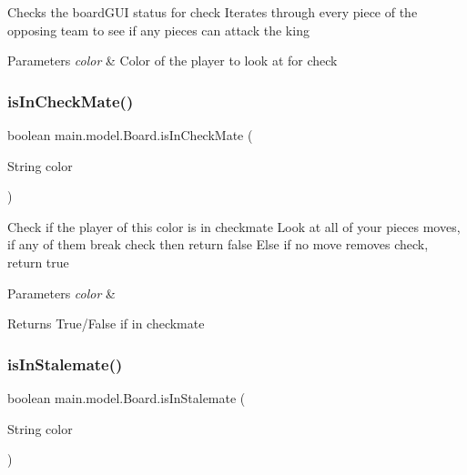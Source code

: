 Checks the board\+G\+UI status for check Iterates through every piece of the opposing team to see if any pieces can attack the king 
\begin{DoxyParams}{Parameters}
{\em color} & Color of the player to look at for check \\
\hline
\end{DoxyParams}
\hypertarget{classmain_1_1model_1_1_board_abb5dfd9e2e597dd686351c1f06fbcb38}{}\label{classmain_1_1model_1_1_board_abb5dfd9e2e597dd686351c1f06fbcb38} 
\subsubsection{\texorpdfstring{is\+In\+Check\+Mate()}{isInCheckMate()}}
{\footnotesize\ttfamily boolean main.\+model.\+Board.\+is\+In\+Check\+Mate (\begin{DoxyParamCaption}\item[{String}]{color }\end{DoxyParamCaption})}

Check if the player of this color is in checkmate Look at all of your piece\textquotesingle{}s moves, if any of them break check then return false Else if no move removes check, return true 
\begin{DoxyParams}{Parameters}
{\em color} & \\
\hline
\end{DoxyParams}
\begin{DoxyReturn}{Returns}
True/\+False if in checkmate 
\end{DoxyReturn}
\hypertarget{classmain_1_1model_1_1_board_a6c144f940cc67d3f2f648f7fcc58294b}{}\label{classmain_1_1model_1_1_board_a6c144f940cc67d3f2f648f7fcc58294b} 
\subsubsection{\texorpdfstring{is\+In\+Stalemate()}{isInStalemate()}}
{\footnotesize\ttfamily boolean main.\+model.\+Board.\+is\+In\+Stalemate (\begin{DoxyParamCaption}\item[{String}]{color }\end{DoxyParamCaption})}

